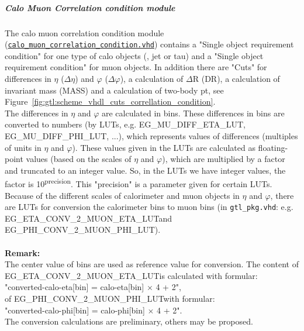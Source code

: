 \subparagraph{Calo Muon Correlation condition module}
\label{sec:gtl:calo_muon_correlation_condition_module}

The calo muon correlation condition module (\href{https://github.com/cms-l1-globaltrigger/mp7_ugt_legacy/tree/master/firmware/hdl/gt_mp7_core/gtl_fdl_wrapper/gtl/calo_muon_correlation_condition.vhd}{\texttt{calo\_muon\_correlation\_condition.vhd}}) contains a "Single object requirement condition" for one type of calo objects (\egamma, jet or tau) and a "Single object requirement condition" for muon objects.
In addition there are "Cuts" for differences in $\eta$ ($\Delta\eta$) and $\varphi$ ($\Delta\varphi$), a calculation of $\Delta$R (DR), a calculation of invariant mass (MASS) and a calculation of two-body pt, see Figure~\ref{fig:gtl:scheme_vhdl_cuts_correllation_condition}.\\
The differences in $\eta$ and $\varphi$ are calculated in bins. These differences in bins are converted to numbers (by LUTs, e.g. \small{EG\_MU\_DIFF\_ETA\_LUT, EG\_MU\_DIFF\_PHI\_LUT}\normalsize, ...), which represents values of differences (multiples of units in $\eta$ and $\varphi$).
These values given in the LUTs are calculated as floating-point values (based on the scales of $\eta$ and $\varphi$), which are multiplied by a factor and truncated to an integer value.
So, in the LUTs we have integer values, the factor is 10\textsuperscript{\tiny{precision}\normalsize}. This "precision" is a parameter given for certain LUTs.\\
Because of the different scales of calorimeter and muon objects in $\eta$ and $\varphi$, there are LUTs for conversion the calorimeter bins to muon bins (in \texttt{gtl\_pkg.vhd}:
 e.g. \small{EG\_ETA\_CONV\_2\_MUON\_ETA\_LUT}\normalsize and \small{EG\_PHI\_CONV\_2\_MUON\_PHI\_LUT}\normalsize).\\\\
\textbf{Remark:}\\
The center value of bins are used as reference value for conversion.
The content of \small{EG\_ETA\_CONV\_2\_MUON\_ETA\_LUT}\normalsize is calculated with formular:\\ "converted-calo-eta[bin] = calo-eta[bin] $\times$ 4 + 2",\\
of \small{EG\_PHI\_CONV\_2\_MUON\_PHI\_LUT}\normalsize with formular:\\
"converted-calo-phi[bin] = calo-phi[bin] $\times$ 4 + 2".\\
The conversion calculations are preliminary, others may be proposed.\\\\
